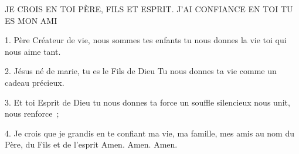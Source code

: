 JE CROIS EN TOI PÈRE, FILS ET ESPRIT.  J’AI CONFIANCE EN TOI TU ES MON AMI

    1. Père Créateur de vie, nous sommes tes enfants tu nous donnes la vie toi qui nous aime tant.

    2. Jésus né de marie, tu es le Fils de Dieu Tu nous donnes ta vie comme un cadeau précieux.

    3. Et toi Esprit de Dieu tu nous donnes ta force un souffle silencieux nous unit, nous renforce ;

    4. Je crois que je grandis en te confiant ma vie, ma famille, mes amis au nom du Père, du Fils et de l’esprit Amen. Amen. Amen.
